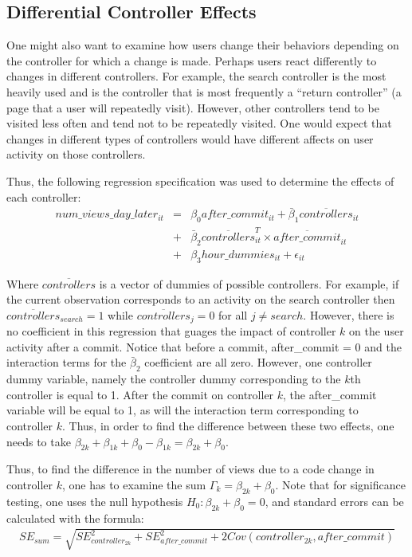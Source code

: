 \documentclass[10pt]{article}
\begin{document}
\subsection{Differential Controller Effects}

One might also want to examine how users change their behaviors depending on the controller for which a change is made. Perhaps users react differently to changes in different controllers. For example, the search controller is the most heavily used and is the controller that is most frequently a ``return controller'' (a page that a user will repeatedly visit). However, other controllers tend to be visited less often and tend not to be repeatedly visited. One would expect that changes in different types of controllers would have different affects on user activity on those controllers. 

Thus, the following regression specification was used to determine the effects of each controller:
\begin{eqnarray}
num\_views\_day\_later_{it} &=& \beta_0 after\_commit_{it} + \bar{\beta}_1 \overline{controllers}_{it} \\ \nonumber
&+& \bar{\beta}_2 \overline{controllers}_{it}^T \times \overline{after\_commit}_{it} \\ \nonumber
&+& \beta_3 hour\_dummies_{it} + \epsilon_{it}
\end{eqnarray}

Where $\overline{controllers}$ is a vector of dummies of possible controllers. For example, if the current observation corresponds to an activity on the search controller then $\overline{controllers}_{search} = 1$ while $\overline{controllers}_j = 0$ for all $j \neq search$. However, there is no coefficient in this regression that guages the impact of controller $k$ on the user activity after a commit. Notice that before a commit, after\_commit = 0 and the interaction terms for the $\bar{\beta}_2$ coefficient are all zero. However, one controller dummy variable, namely the controller dummy corresponding to the $k$th controller is equal to 1. After the commit on controller $k$, the after\_commit variable will be equal to 1, as will the interaction term corresponding to controller $k$. Thus, in order to find the difference between these two effects, one needs to take $\beta_{2k} + \beta_{1k} + \beta_0 - \beta_{1k} = \beta_{2k} + \beta_0$. 

Thus, to find the difference in the number of views due to a code change in controller $k$, one has to examine the sum $\Gamma_k = \beta_{2k} + \beta_0$. Note that for significance testing, one uses the null hypothesis $H_0: \beta_{2k} + \beta_0 = 0$, and standard errors can be calculated with the formula:
\begin{eqnarray}
SE_{sum} = \sqrt{ SE_{controller_{2k}}^2 + SE_{after\_commit}^2 + 2 Cov(controller_{2k}, after\_commit)}
\end{eqnarray}
\end{document}
